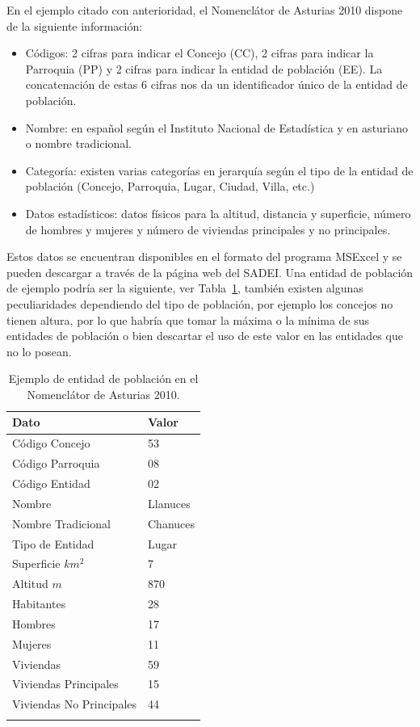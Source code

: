 En el ejemplo citado con anterioridad, el Nomenclátor de Asturias 2010 dispone de la siguiente información:
\begin{itemize}
 \item Códigos: 2 cifras para indicar el Concejo (CC), 2 cifras para indicar la Parroquia (PP) y 2 cifras para indicar la entidad de población (EE). La
concatenación de estas 6 cifras nos da un identificador único de la entidad de población.
\item Nombre: en español según el Instituto Nacional de Estadística y en asturiano o nombre tradicional.
\item Categoría: existen varias categorías en jerarquía según el tipo de la entidad de población (Concejo, Parroquia, Lugar, Ciudad, Villa, etc.)
\item Datos estadísticos: datos físicos para la altitud, distancia y superficie, número de hombres y mujeres y número de viviendas
principales y no principales.
\end{itemize}

Estos datos se encuentran disponibles en el formato del programa MSExcel y se pueden descargar a través de la página web del SADEI. Una entidad
de población de ejemplo podría ser la siguiente, ver Tabla~\ref{tabla:ejemplo-datos}, también existen algunas peculiaridades dependiendo
del tipo de población, por ejemplo los concejos no tienen altura, por lo que habría que tomar la máxima o la mínima de sus entidades
de población o bien descartar el uso de este valor en las entidades que no lo posean.


\begin{longtable}[c]{|p{6cm}|p{8cm}|} 

\hline

  \textbf{Dato} &  \textbf{Valor} \\\hline

\endhead
Código Concejo & 53 \\ \hline
Código Parroquia & 08 \\ \hline
Código Entidad & 02 \\ \hline
Nombre & Llanuces \\ \hline
Nombre Tradicional & Chanuces \\ \hline
Tipo de Entidad & Lugar \\ \hline
Superficie $km^{2}$ & 7 \\ \hline
Altitud $m$ & 870 \\ \hline
Habitantes & 28 \\ \hline
Hombres & 17 \\ \hline
Mujeres & 11 \\ \hline
Viviendas & 59 \\ \hline
Viviendas Principales & 15 \\ \hline
Viviendas No Principales & 44 \\ \hline
\hline
\caption{Ejemplo de entidad de población en el Nomenclátor de Asturias 2010.}  \label{tabla:ejemplo-datos}\\    
\end{longtable}

